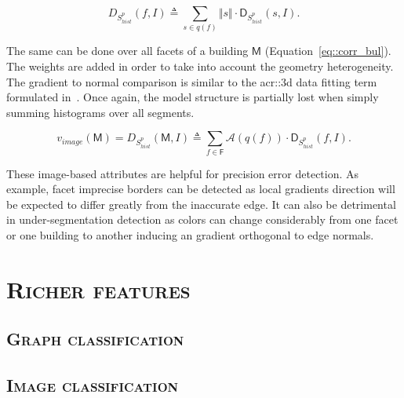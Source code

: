         \begin{equation}
            \label{eq::corr_fac}
            D_{S_{hist}^p}(f, I) \triangleq \sum_{s \in q(f)} \Vert s \Vert \cdot \mathsf{D}_{S_{hist}^p}(s, I).
        \end{equation}

        The same can be done over all facets of a building $\mathsf{M}$ (Equation~\ref{eq::corr_bul}).
        The weights are added in order to take into account the geometry heterogeneity.
        The gradient to normal comparison is similar to the \gls{acr::3d} data fitting term formulated in~\parencite{li2016manhattan}.
        Once again, the model structure is partially lost when simply summing histograms over all segments.

        \begin{equation}
            \label{eq::corr_bul}
            v_{image}(\mathsf{M}) = D_{S_{hist}^p}(\mathsf{M}, I) \triangleq \sum_{f \in \mathsf{F}} \mathscr{A}(q(f)) \cdot \mathsf{D}_{S_{hist}^p}(f, I).
        \end{equation}
        
        These image-based attributes are helpful for precision error detection.
        As example, facet imprecise borders can be detected as local gradients direction will be expected to differ greatly from the inaccurate edge.
        It can also be detrimental in under-segmentation detection as colors can change considerably from one facet or one building to another inducing an gradient orthogonal to edge normals.

\section{\textsc{Richer features}}
    \label{sec::learned_evaluation::richer_features}
    \subsection{\textsc{Graph classification}}
    \subsection{\textsc{Image classification}}
